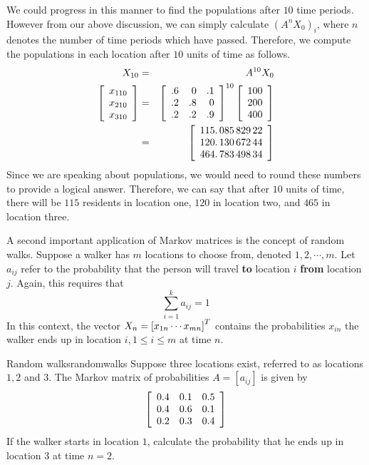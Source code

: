 \begin{solution}
We could progress in this manner to find the populations after $10$ time periods. However from our above discussion, we can simply calculate $\left( A^{n}X_0\right) _{i}$, 
where $n$ denotes the number of time periods which have passed. Therefore, we compute the populations in each location after $10$ units of time as follows. 
\begin{eqnarray*}
X_{10} &=& A^{10}X_0 \\
\left[ \begin{array}{r}
x_{1 10} \\
x_{2 10} \\
x_{3 10} 
\end{array}
\right] 
&=& 
\left[
\begin{array}{rrr}
.6 & 0 & .1 \\
.2 & .8 & 0 \\
.2 & .2 & .9
\end{array}
\right] ^{10}\left[
\begin{array}{r}
100 \\
200 \\
400
\end{array}
\right] \\
&=&  \left[
\begin{array}{c}
115.\,\allowbreak 085\,829\,22 \\
120.\,\allowbreak 130\,672\,44 \\
464.\,\allowbreak 783\,498\,34
\end{array}
\right]
\end{eqnarray*}
Since we are speaking about populations, we would need to round these numbers to provide a logical 
answer. Therefore, we can say that after $10$ units of time, there will be $115$ residents in location one, $120$ in location two,
and $465$ in location three.
\end{solution}

A second important application of Markov matrices is the concept of random walks. Suppose a walker has $m$ locations to choose from, denoted $1, 2, \cdots, m$. Let $a_{ij}$ refer to the probability that the person will travel \textbf{to}  location $i$ \textbf{from} location $j$. Again, this requires that
\[
\sum_{i=1}^{k}a_{ij}=1
\]
In this context, the vector $X_n=\left[ x_{1n} \cdots x_{mn}\right] ^{T}$ contains the probabilities $x_{in}$ the walker ends up in location $i, 1\leq i \leq m$ at time $n$. 

\begin{example}{Random walks}{randomwalks}
Suppose three locations exist, referred to as locations $1, 2$ and $3$. The Markov matrix of probabilities $A = [a_{ij}]$ is given by
\[
\left[
\begin{array}{rrr}
0.4 & 0.1 & 0.5 \\
0.4 & 0.6 & 0.1 \\
0.2 & 0.3 & 0.4
\end{array}
\right]
\]
If the walker starts in location $1$, calculate the probability that he ends up in location $3$ at time $n = 2$. 
\end{example}

